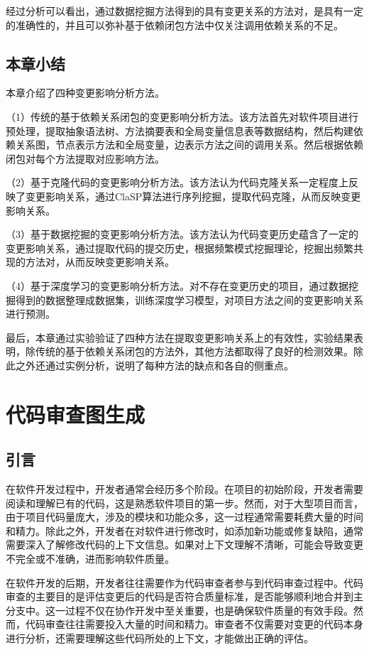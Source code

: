 经过分析可以看出，通过数据挖掘方法得到的具有变更关系的方法对，是具有一定的准确性的，并且可以弥补基于依赖闭包方法中仅关注调用依赖关系的不足。

\section{本章小结}

本章介绍了四种变更影响分析方法。

（1）传统的基于依赖关系闭包的变更影响分析方法。该方法首先对软件项目进行预处理，提取抽象语法树、方法摘要表和全局变量信息表等数据结构，然后构建依赖关系图，节点表示方法和全局变量，边表示方法之间的调用关系。然后根据依赖闭包对每个方法提取对应影响方法。

（2）基于克隆代码的变更影响分析方法。该方法认为代码克隆关系一定程度上反映了变更影响关系，通过ClaSP算法进行序列挖掘，提取代码克隆，从而反映变更影响关系。

（3）基于数据挖掘的变更影响分析方法。该方法认为代码变更历史蕴含了一定的变更影响关系，通过提取代码的提交历史，根据频繁模式挖掘理论，挖掘出频繁共现的方法对，从而反映变更影响关系。

（4）基于深度学习的变更影响分析方法。对不存在变更历史的项目，通过数据挖掘得到的数据整理成数据集，训练深度学习模型，对项目方法之间的变更影响关系进行预测。

最后，本章通过实验验证了四种方法在提取变更影响关系上的有效性，实验结果表明，除传统的基于依赖关系闭包的方法外，其他方法都取得了良好的检测效果。除此之外还通过实例分析，说明了每种方法的缺点和各自的侧重点。



\chapter{代码审查图生成}
\section{引言}


在软件开发过程中，开发者通常会经历多个阶段。在项目的初始阶段，开发者需要阅读和理解已有的代码，这是熟悉软件项目的第一步。然而，对于大型项目而言，由于项目代码量庞大，涉及的模块和功能众多，这一过程通常需要耗费大量的时间和精力。除此之外，开发者在对软件进行修改时，如添加新功能或修复缺陷，通常需要深入了解修改代码的上下文信息。如果对上下文理解不清晰，可能会导致变更不完全或不准确，进而影响软件质量。

在软件开发的后期，开发者往往需要作为代码审查者参与到代码审查过程中。代码审查的主要目的是评估变更后的代码是否符合质量标准，是否能够顺利地合并到主分支中。这一过程不仅在协作开发中至关重要，也是确保软件质量的有效手段。然而，代码审查往往需要投入大量的时间和精力\cite{花子涵2024代码审查自动化研究综述}。审查者不仅需要对变更的代码本身进行分析，还需要理解这些代码所处的上下文，才能做出正确的评估。


